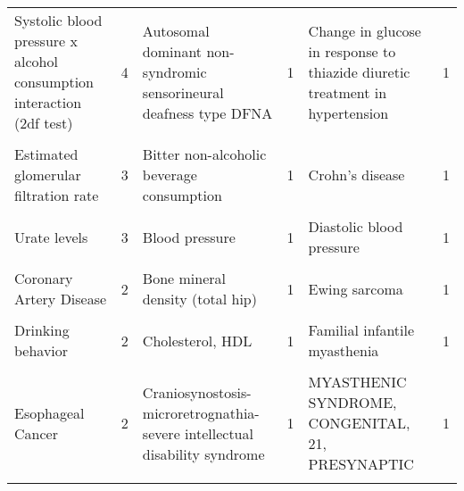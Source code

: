 \begin{table}[H]
{\begin{tabular}[t]{lrlrlr}
Systolic blood pressure x alcohol consumption interaction (2df test) & 4 & Autosomal dominant non-syndromic sensorineural deafness type DFNA & 1 & Change in glucose in response to thiazide diuretic treatment in hypertension & 1\\
\cellcolor{gray!6}{Diastolic blood pressure x alcohol consumption (light vs heavy) interaction (2df test)} & \cellcolor{gray!6}{3} & \cellcolor{gray!6}{Autosomal dominant nonsyndromic deafness 2A} & \cellcolor{gray!6}{1} & \cellcolor{gray!6}{Chronic obstructive pulmonary disease or high blood pressure (pleiotropy)} & \cellcolor{gray!6}{1}\\
Estimated glomerular filtration rate & 3 & Bitter non-alcoholic beverage consumption & 1 & Crohn's disease & 1\\
\cellcolor{gray!6}{Hematological and biochemical traits} & \cellcolor{gray!6}{3} & \cellcolor{gray!6}{Blood metabolite levels} & \cellcolor{gray!6}{1} & \cellcolor{gray!6}{Cutaneous psoriasis} & \cellcolor{gray!6}{1}\\
Urate levels & 3 & Blood pressure & 1 & Diastolic blood pressure & 1\\
\cellcolor{gray!6}{Alcohol dependence} & \cellcolor{gray!6}{2} & \cellcolor{gray!6}{Body Height} & \cellcolor{gray!6}{1} & \cellcolor{gray!6}{Diastolic blood pressure x alcohol consumption interaction (2df test)} & \cellcolor{gray!6}{1}\\
Coronary Artery Disease & 2 & Bone mineral density (total hip) & 1 & Ewing sarcoma & 1\\
\cellcolor{gray!6}{Diastolic blood pressure} & \cellcolor{gray!6}{2} & \cellcolor{gray!6}{Cerebral amyloid deposition in APOEe4 non-carriers (PET imaging)} & \cellcolor{gray!6}{1} & \cellcolor{gray!6}{FETAL AKINESIA DEFORMATION SEQUENCE} & \cellcolor{gray!6}{1}\\
Drinking behavior & 2 & Cholesterol, HDL & 1 & Familial infantile myasthenia & 1\\
\cellcolor{gray!6}{Educational attainment} & \cellcolor{gray!6}{2} & \cellcolor{gray!6}{Corneal structure} & \cellcolor{gray!6}{1} & \cellcolor{gray!6}{Inflammatory bowel disease} & \cellcolor{gray!6}{1}\\
Esophageal Cancer & 2 & Craniosynostosis-microretrognathia-severe intellectual disability syndrome & 1 & MYASTHENIC SYNDROME, CONGENITAL, 21, PRESYNAPTIC & 1\\
\cellcolor{gray!6}{Gout combined type} & \cellcolor{gray!6}{2} & \cellcolor{gray!6}{DEAFNESS, AUTOSOMAL DOMINANT 2A} & \cellcolor{gray!6}{1} & \cellcolor{gray!6}{Malignant tumor of prostate} & \cellcolor{gray!6}{1}\\

\end{tabular}}
\end{table}
